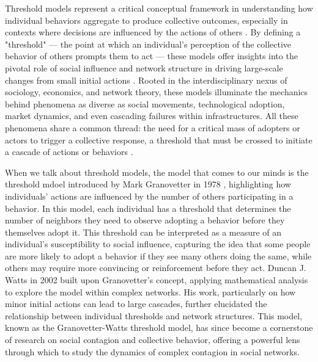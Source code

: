 Threshold models represent a critical conceptual framework in understanding how individual behaviors aggregate to produce collective outcomes, especially in contexts where decisions are influenced by the actions of others \cite{granovetter-1973,granovetter-1978}. By defining a "threshold" — the point at which an individual's perception of the collective behavior of others prompts them to act — these models offer insights into the pivotal role of social influence and network structure in driving large-scale changes from small initial actions \cite{dodds-2004}. Rooted in the interdisciplinary nexus of sociology, economics, and network theory, these models illuminate the mechanics behind phenomena as diverse as social movements, technological adoption, market dynamics, and even cascading failures within infrastructures. All these phenomena share a common thread: the need for a critical mass of adopters or actors to trigger a collective response, a threshold that must be crossed to initiate a cascade of actions or behaviors \cite{centola-2007,centola-2010}.

When we talk about threshold models, the model that comes to our minds is the threshold mdoel introduced by Mark Granovetter in 1978 \cite{granovetter-1978}, highlighting how individuals' actions are influenced by the number of others participating in a behavior. In this model, each individual has a threshold that determines the number of neighbors they need to observe adopting a behavior before they themselves adopt it. This threshold can be interpreted as a measure of an individual's susceptibility to social influence, capturing the idea that some people are more likely to adopt a behavior if they see many others doing the same, while others may require more convincing or reinforcement before they act. Duncan J. Watts in 2002 \cite{watts-2002} built upon Granovetter's concept, applying mathematical analysis to explore the model within complex networks. His work, particularly on how minor initial actions can lead to large cascades, further elucidated the relationship between individual thresholds and network structures. This model, known as the Granovetter-Watts threshold model, has since become a cornerstone of research on social contagion and collective behavior, offering a powerful lens through which to study the dynamics of complex contagion in social networks.

